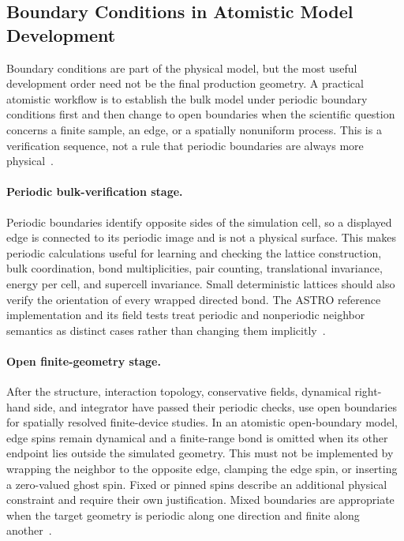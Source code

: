\subsection{Boundary Conditions in Atomistic Model Development}

Boundary conditions are part of the physical model, but the most useful
development order need not be the final production geometry.  A practical
atomistic workflow is to establish the bulk model under periodic boundary
conditions first and then change to open boundaries when the scientific
question concerns a finite sample, an edge, or a spatially nonuniform
process.  This is a verification sequence, not a rule that periodic
boundaries are always more physical~\cite{astro-code,kong2026spatially}.

\paragraph{Periodic bulk-verification stage.}
Periodic boundaries identify opposite sides of the simulation cell, so a
displayed edge is connected to its periodic image and is not a physical
surface.  This makes periodic calculations useful for learning and checking
the lattice construction, bulk coordination, bond multiplicities, pair
counting, translational invariance, energy per cell, and supercell
invariance.  Small deterministic lattices should also verify the orientation
of every wrapped directed bond.  The ASTRO reference implementation and its
field tests treat periodic and nonperiodic neighbor semantics as distinct
cases rather than changing them implicitly~\cite{astro-code}.

\paragraph{Open finite-geometry stage.}
After the structure, interaction topology, conservative fields, dynamical
right-hand side, and integrator have passed their periodic checks, use open
boundaries for spatially resolved finite-device studies.  In an atomistic
open-boundary model, edge spins remain dynamical and a finite-range bond is
omitted when its other endpoint lies outside the simulated geometry.  This
must not be implemented by wrapping the neighbor to the opposite edge,
clamping the edge spin, or inserting a zero-valued ghost spin.  Fixed or
pinned spins describe an additional physical constraint and require their
own justification.  Mixed boundaries are appropriate when the target
geometry is periodic along one direction and finite along
another~\cite{astro-code}.

